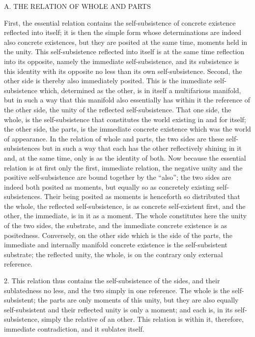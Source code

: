 A. THE RELATION OF WHOLE AND PARTS

First, the essential relation contains the self-subsistence
of concrete existence reflected into itself;
it is then the simple form whose determinations are
indeed also concrete existences,
but they are posited at the same time,
moments held in the unity.
This self-subsistence reflected into itself is
at the same time reflection into its opposite,
namely the immediate self-subsistence,
and its subsistence is this identity with its opposite
no less than its own self-subsistence.
Second, the other side is
thereby also immediately posited.
This is the immediate self-subsistence
which, determined as the other,
is in itself a multifarious manifold,
but in such a way that this manifold also essentially
has within it the reference of the other side,
the unity of the reflected self-subsistence.
That one side, the whole, is the self-subsistence
that constitutes the world existing in and for itself;
the other side, the parts,
is the immediate concrete existence
which was the world of appearance.
In the relation of whole and parts,
the two sides are these self-subsistences
but in such a way that each has the other
reflectively shining in it
and, at the same time, only is as the identity of both.
Now because the essential relation is
at first only the first, immediate relation,
the negative unity and the positive self-subsistence
are bound together by the “also”;
the two sides are indeed both posited as moments,
but equally so as concretely existing self-subsistences.
Their being posited as moments is henceforth so distributed
that the whole, the reflected self-subsistence, is
as concrete self-existent first,
and the other, the immediate, is in it as a moment.
The whole constitutes here the
unity of the two sides, the substrate,
and the immediate concrete existence is as positedness.
Conversely, on the other side which is the side of the parts,
the immediate and internally manifold concrete existence is
the self-subsistent substrate;
the reflected unity, the whole,
is on the contrary only external reference.

2. This relation thus contains
the self-subsistence of the sides,
and their sublatedness no less,
and the two simply in one reference.
The whole is the self-subsistent;
the parts are only moments of this unity,
but they are also equally self-subsistent
and their reflected unity is only a moment;
and each is, in its self-subsistence,
simply the relative of an other.
This relation is within it, therefore,
immediate contradiction, and it sublates itself.

